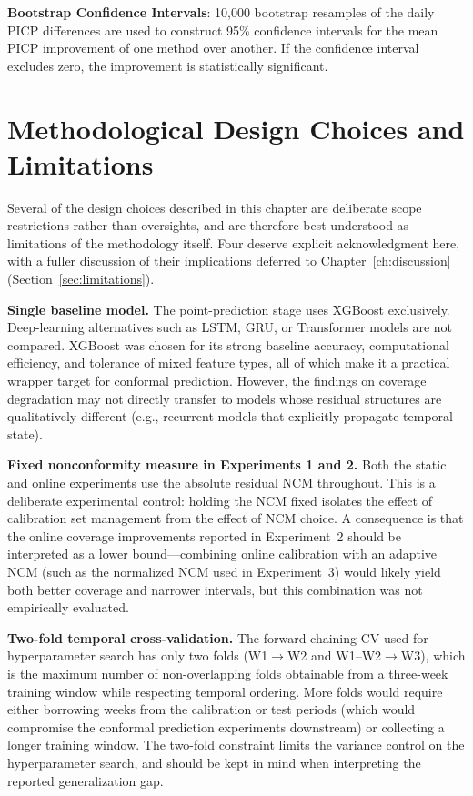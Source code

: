 \textbf{Bootstrap Confidence Intervals}: 10,000 bootstrap resamples of the daily PICP differences are used to construct 95\% confidence intervals for the mean PICP improvement of one method over another. If the confidence interval excludes zero, the improvement is statistically significant.


\section{Methodological Design Choices and Limitations}
\label{sec:methodology_limitations}

Several of the design choices described in this chapter are deliberate scope restrictions rather than oversights, and are therefore best understood as limitations of the methodology itself. Four deserve explicit acknowledgment here, with a fuller discussion of their implications deferred to Chapter~\ref{ch:discussion} (Section~\ref{sec:limitations}).

\textbf{Single baseline model.} The point-prediction stage uses XGBoost exclusively. Deep-learning alternatives such as LSTM, GRU, or Transformer models are not compared. XGBoost was chosen for its strong baseline accuracy, computational efficiency, and tolerance of mixed feature types, all of which make it a practical wrapper target for conformal prediction. However, the findings on coverage degradation may not directly transfer to models whose residual structures are qualitatively different (e.g., recurrent models that explicitly propagate temporal state).

\textbf{Fixed nonconformity measure in Experiments 1 and 2.} Both the static and online experiments use the absolute residual NCM throughout. This is a deliberate experimental control: holding the NCM fixed isolates the effect of calibration set management from the effect of NCM choice. A consequence is that the online coverage improvements reported in Experiment~2 should be interpreted as a lower bound---combining online calibration with an adaptive NCM (such as the normalized NCM used in Experiment~3) would likely yield both better coverage and narrower intervals, but this combination was not empirically evaluated.

\textbf{Two-fold temporal cross-validation.} The forward-chaining CV used for hyperparameter search has only two folds (W1$\rightarrow$W2 and W1--W2$\rightarrow$W3), which is the maximum number of non-overlapping folds obtainable from a three-week training window while respecting temporal ordering. More folds would require either borrowing weeks from the calibration or test periods (which would compromise the conformal prediction experiments downstream) or collecting a longer training window. The two-fold constraint limits the variance control on the hyperparameter search, and should be kept in mind when interpreting the reported generalization gap.

